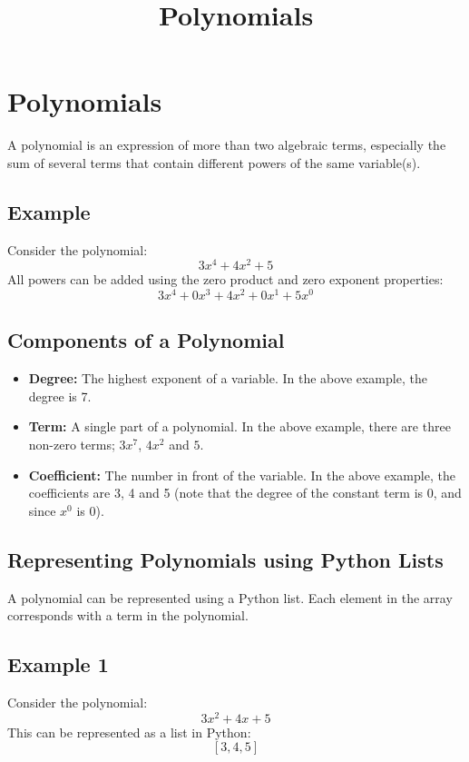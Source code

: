 \documentclass{article}
\title{Polynomials}
\author{}
\date{}
\begin{document}
\maketitle

\section*{Polynomials}

A polynomial is an expression of more than two algebraic terms, especially the sum of several terms that contain different powers of the same variable(s).

\subsection*{Example}
Consider the polynomial:
$$ 3x^4 + 4x^2 + 5 $$
All powers can be added using the zero product and zero exponent properties:
$$ 3x^4 + 0x^3 + 4x^2 + 0x^1 + 5x^0 $$

\subsection*{Components of a Polynomial}
\begin{itemize}
  \item \textbf{Degree:} The highest exponent of a variable. In the above example, the degree is 7.
  \item \textbf{Term:} A single part of a polynomial. In the above example, there are three non-zero terms; \( 3x^7 \), \( 4x^2 \) and \( 5 \).
  \item \textbf{Coefficient:} The number in front of the variable. In the above example, the coefficients are 3, 4 and 5 (note that the degree of the constant term is 0, and since \(x^0\) is 0).
\end{itemize}

\subsection*{Representing Polynomials using Python Lists}

A polynomial can be represented using a Python list. Each element in the array corresponds with a term in the polynomial.

\subsection*{Example 1}
Consider the polynomial:
$$ 3x^2 + 4x + 5 $$
This can be represented as a list in Python:
$$[3, 4, 5] $$
\end{document}
